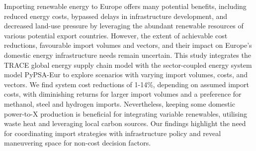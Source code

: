 
Importing renewable energy to Europe offers many potential benefits, including
reduced energy costs, bypassed delays in infrastructure development, and
decreased land-use pressure by leveraging the abundant renewable resources of
various potential export countries.
However, the extent of achievable cost reductions, favourable import volumes and
vectors, and their impact on Europe's domestic energy infrastructure needs
remain uncertain.
This study integrates the TRACE global energy supply chain model with the
sector-coupled energy system model PyPSA-Eur to explore scenarios with varying
import volumes, costs, and vectors.
We find system cost reductions of 1-14\%, depending on assumed import costs,
with diminishing returns for larger import volumes and a preference for
methanol, steel and hydrogen imports. Nevertheless, keeping some domestic
power-to-X production is beneficial for integrating variable renewables,
utilising waste heat and leveraging local carbon sources.
Our findings highlight the need for coordinating import strategies with
infrastructure policy and reveal maneuvering space for non-cost decision
factors.
